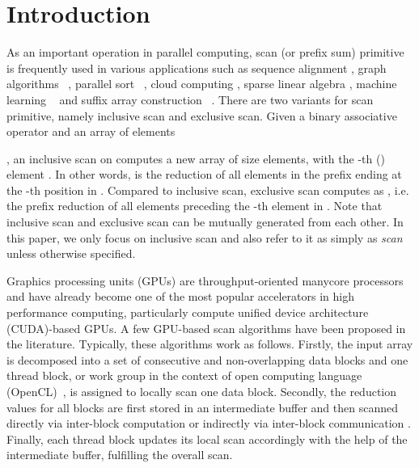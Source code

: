 \documentclass[article]{elsarticle}
\begin{document}
\section{Introduction}
As an important operation in parallel computing, scan (or prefix sum) primitive \cite{blelloch1989scans} is frequently used in various applications such as sequence alignment \cite{aluru2003parallel} \cite{khajeh2010acceleration}, graph algorithms \cite{vineet2009fast}~\cite{merrill2012scalable}, parallel sort \cite{cederman2009sorting}~\cite{satish2009designing}, cloud computing \cite{fang2011mars}, sparse linear algebra \cite{zhang2012novel}, machine learning \cite{kohlhoff2013k}~\cite{niu2014fast} and suffix array construction \cite{liuparallel}~\cite{patrick2015}. There are two variants for scan primitive, namely inclusive scan and exclusive scan. Given a binary associative operator  and an array of  elements {, an inclusive scan on  computes a new array  of size  elements, with the -th (\mbox{}) element \mbox{}. In other words,  is the reduction of all elements in the prefix ending at the -th position in . Compared to inclusive scan, exclusive scan computes  as \mbox{}, i.e. the prefix reduction of all elements preceding the -th element in . Note that inclusive scan and exclusive scan can be mutually generated from each other. In this paper, we only focus on inclusive scan and also refer to it as simply as \textit{scan} unless otherwise specified. 

Graphics processing units (GPUs) are throughput-oriented manycore processors and have already become one of the most popular accelerators in high performance computing, particularly compute unified device architecture (CUDA)-based GPUs. A few GPU-based scan algorithms \cite{sengupta2007scan} \cite{harris2007parallel} \cite{dotsenko2008fast} \cite{wei2012optimization} \cite{yan2013streamscan} have been proposed in the literature. Typically, these algorithms work as follows. Firstly, the input array  is decomposed into a set of consecutive and non-overlapping data blocks and one thread block, or work group in the context of open computing language (OpenCL)~\cite{stone2010opencl}, is assigned to locally scan one data block. Secondly, the reduction values for all blocks are first stored in an intermediate buffer and then scanned directly via inter-block computation \cite{harris2007parallel} \cite{dotsenko2008fast} or indirectly via inter-block communication \cite{yan2013streamscan}. Finally, each thread block updates its local scan accordingly with the help of the intermediate buffer, fulfilling the overall scan.

}
\end{document}

